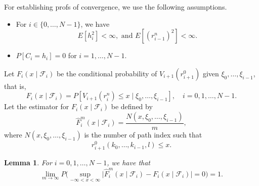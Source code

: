 \documentclass[10pt,a4paper]{amsart}
\numberwithin{equation}{section}
\newtheorem{lemma}[theo]{Lemma}
\begin{document}
For  establishing profs of convergence, we use the following assumptions.
\begin{itemize}  %
\item[(A1)] For $i \in\{0, \dots, N-1\}$, we have
\[
 E[h_i^2]<\infty, \text{ and } E[\left(r_{i-1}^n\right)^2]<\infty .
\]
\item[(A2)] %
 $P[C_i=h_i]=0$ for $i=1, \dots, N-1$.
\end{itemize}
Let $F_i\left(x\mid \mathcal{F}_i \right)$ be the conditional probability of 
$V_{i+1}\left(r_{i+1}^0\right)$ given $\xi_0,\dots,\xi_{i-1}$, that is,
\[
 F_i\left(x\mid \mathcal{F}_i \right)
 =P[V_{i+1}\left(r_{i}^n\right) \leq x \mid \xi_0,\dots,\xi_{i-1}], \quad
 i=0,1, \dots, N-1 .
\]
Let the estimator for $F_i\left(x\mid \mathcal{F}_i \right)$ be defined by
\[
 \hat{F}_i^m\left(x\mid \mathcal{F}_i \right)
 =\frac{N\left(x, \xi_0,\dots,\xi_{i-1}\right)}{m},
\]
where $N\left(x, \xi_0,\dots,\xi_{i-1}\right)$ is the number of path index such that
\[
 r_{i+1}^{0}\left(k_0,\dots,k_{i-1},l\right) \leq x.
\]

\begin{lemma} \label{FF}
 For $i=0,1, \dots, N-1$, we have that
\[
 \lim _{m \to \infty} P\Big( \sup _{-\infty<x<\infty}
 \big|\hat{F}_i^m\left(x\mid \mathcal{F}_i \right)-F_i\left(x\mid \mathcal{F}_i 
 \right)\big|=0\Big)=1.
\]
\end{lemma}
\end{document}
